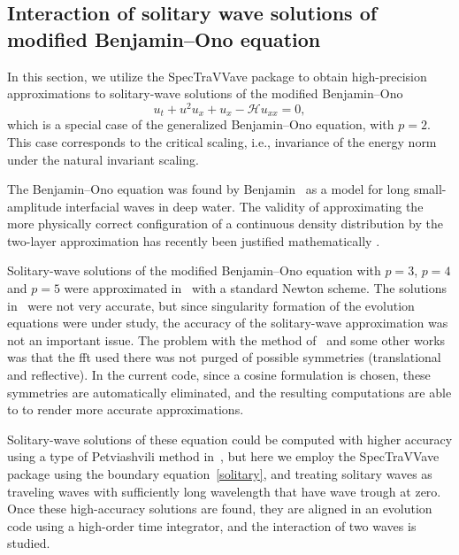 
\subsection{Interaction of solitary wave solutions of modified Benjamin--Ono equation}
\label{mB-O-interact}

In this section, we utilize the \textsf{SpecTraVVave} package to obtain
high-precision approximations to solitary-wave solutions of
the modified Benjamin--Ono
\begin{equation*}
u_t + u^2u_x + u_x - \mathcal{H} u_{xx} = 0,
\end{equation*}
which is a special case of the generalized Benjamin--Ono equation, with $p=2$.
This case corresponds to the critical scaling, i.e., invariance of 
the energy norm under the natural invariant scaling.

The Benjamin--Ono equation was found by Benjamin~\cite{B1} as a model
for long small-amplitude interfacial waves in deep water. 
The validity of approximating the more physically correct configuration of a continuous
density distribution by the two-layer approximation has recently been justified mathematically
\cite{ChenWalsh2016}. 
	

Solitary-wave solutions of the modified Benjamin--Ono equation with $p=3$, $p=4$ and $p=5$
were approximated in~\cite{BoKa} with a standard Newton scheme.
The solutions in~\cite{BoKa} were not very accurate, 
but since singularity formation of the evolution
equations were under study,
the accuracy of the solitary-wave approximation was not an important issue.
The problem with the method of~\cite{BoKa} and some other works was that the fft
used there was not purged of possible symmetries (translational and reflective).
In the current code, since a cosine formulation is chosen, these symmetries
are automatically eliminated, and the resulting computations are able to to
render more accurate approximations. 

Solitary-wave solutions of these equation could be computed with higher accuracy
using a type of Petviashvili method in~\cite{Pelinovsky}, but here we employ
the \textsf{SpecTraVVave} package using the boundary equation~\eqref{solitary},
and treating solitary waves as 
traveling waves with sufficiently long wavelength 
that have wave trough at zero. 
Once these high-accuracy solutions are found, they are aligned in 
an evolution code using a high-order time integrator, and the
interaction of two waves is studied.

